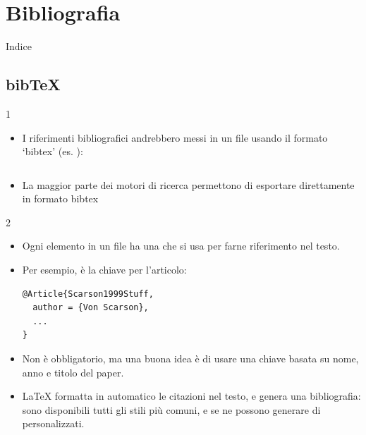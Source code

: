 \documentclass{beamer}
\begin{document}
\section{Bibliografia}

\begin{frame}{Indice}
\begin{multicols}{2}
\tableofcontents[currentsection]
\end{multicols}
\end{frame}

\subsection{bib\TeX}
\begin{frame}[fragile]{\insertsubsection{} 1}
\begin{itemize}
\item I riferimenti bibliografici andrebbero messi in un file 
usando il formato `bibtex' (es. ):

\inputminted[fontsize=\scriptsize,frame=single]{latex}{bib-example.bib}

\item La maggior parte dei motori di ricerca permettono di esportare
direttamente in formato bibtex
\end{itemize}
\end{frame}

\begin{frame}[fragile]{\insertsubsection{} 2}
\begin{itemize}
\item Ogni elemento in un file  ha una  che si usa per farne riferimento nel testo.
\item Per esempio,  \`e la chiave per l'articolo:

\begin{verbatim}
@Article{Scarson1999Stuff,
  author = {Von Scarson},
  ...
}
\end{verbatim}
\item Non \`e obbligatorio, ma una buona idea \`e di usare una chiave basata su
nome, anno e titolo del paper.
\item \LaTeX{} formatta in automatico le citazioni nel testo, e genera una bibliografia: sono disponibili tutti gli stili pi\`u comuni, e se ne possono generare di personalizzati.
\end{itemize}
\end{frame}
\end{document}
